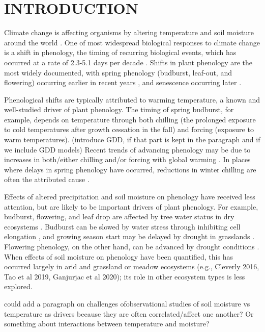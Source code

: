 \documentclass{article}
\begin{document}
\section* {INTRODUCTION}
\par Climate change is affecting organisms by altering temperature and soil moisture around the world \citep{parmesan2006,chen2011}. One of most widespread biological responses to climate change is a shift in phenology, the timing of recurring biological events, which has occurred at a rate of 2.3-5.1 days per decade \citep{parmesan2006,poloczanska2013,root2003}. Shifts in plant phenology are the most widely documented, with spring phenology (budburst, leaf-out, and flowering) occurring earlier in recent years \citep{wolkovich2012}, and senescence occurring later \citep{taylor2008,delpierre2009}. 
\par Phenological shifts are typically attributed to warming temperature, a known and well-studied driver of plant phenology. The timing of spring budburst, for example, depends on temperature through both chilling (the prolonged exposure to cold temperatures after growth cessation in the fall) and forcing (exposure to warm temperatures). (introduce GDD, if that part is kept in the paragraph and if we include GDD models) Recent trends of advancing phenology may be due to increases in both/either chilling and/or forcing with global warming \citep{fujisawa2010, ibanez2010,cook2012b}. In places where delays in spring phenology have occurred, reductions in winter chilling are often the attributed cause \citep{yu2010}. 
\par Effects of altered precipitation and soil moisture on phenology have received less attention, but are likely to be important drivers of plant phenology. For example, budburst, flowering, and leaf drop are affected by tree water status in dry ecosystems \citep[e.g., ][]{essiamah1986,reich1984, van1993}. Budburst can be slowed by water stress through inhibiting cell elongation \citep{essiamah1986}, and growing season start may be delayed by drought in grasslands \cite{cui2017}. Flowering phenology, on the other hand, can be advanced by drought conditions \citep{hamann2018}. When effects of soil moisture on phenology have been quantified, this has occurred largely in arid and grassland or meadow ecosystems (e.g., Cleverly 2016, Tao et al 2019, Ganjurjac et al 2020); its role in other ecosystem types is less explored.
\par could add a paragraph on challenges ofobservational studies of soil moisture vs temperature as drivers because they are often correlated/affect one another? Or something about interactions between temperature and moisture? 
\end{document}
